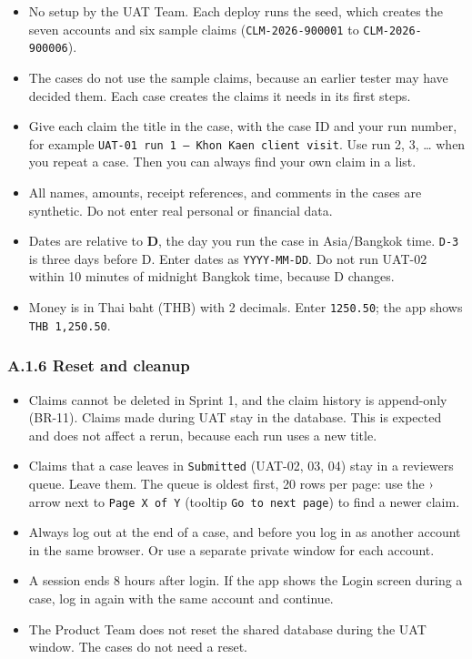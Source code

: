 \begin{itemize}
\tightlist
\item
  No setup by the UAT Team. Each deploy runs the seed, which creates the seven accounts and six sample claims (\texttt{CLM-2026-900001} to \texttt{CLM-2026-900006}).
\item
  The cases do not use the sample claims, because an earlier tester may have decided them. Each case creates the claims it needs in its first steps.
\item
  Give each claim the title in the case, with the case ID and your run number, for example \texttt{UAT-01 run 1 – Khon Kaen client visit}. Use run 2, 3, \ldots{} when you repeat a case. Then you can always find your own claim in a list.
\item
  All names, amounts, receipt references, and comments in the cases are synthetic. Do not enter real personal or financial data.
\item
  Dates are relative to \textbf{D}, the day you run the case in Asia/Bangkok time. \texttt{D-3} is three days before D. Enter dates as \texttt{YYYY-MM-DD}. Do not run UAT-02 within 10 minutes of midnight Bangkok time, because D changes.
\item
  Money is in Thai baht (THB) with 2 decimals. Enter \texttt{1250.50}; the app shows \texttt{THB 1,250.50}.
\end{itemize}

\subsubsection*{A.1.6 Reset and cleanup}

\begin{itemize}
\tightlist
\item
  Claims cannot be deleted in Sprint 1, and the claim history is append-only (BR-11). Claims made during UAT stay in the database. This is expected and does not affect a rerun, because each run uses a new title.
\item
  Claims that a case leaves in \texttt{Submitted} (UAT-02, 03, 04) stay in a reviewer\textquotesingle s queue. Leave them. The queue is oldest first, 20 rows per page: use the › arrow next to \texttt{Page X of Y} (tooltip \texttt{Go to next page}) to find a newer claim.
\item
  Always log out at the end of a case, and before you log in as another account in the same browser. Or use a separate private window for each account.
\item
  A session ends 8 hours after login. If the app shows the Login screen during a case, log in again with the same account and continue.
\item
  The Product Team does not reset the shared database during the UAT window. The cases do not need a reset.
\end{itemize}

